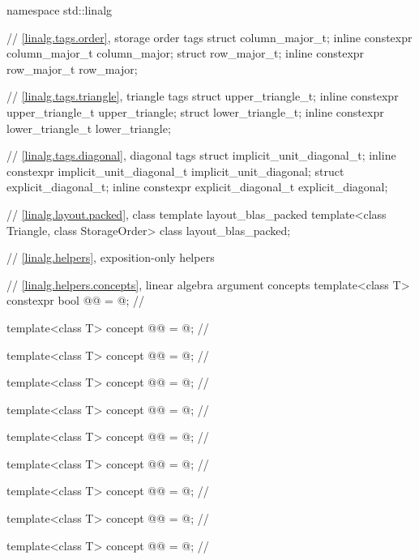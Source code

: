 %
\begin{codeblock}
namespace std::linalg {
  // \ref{linalg.tags.order}, storage order tags
  struct column_major_t;
  inline constexpr column_major_t column_major;
  struct row_major_t;
  inline constexpr row_major_t row_major;

  // \ref{linalg.tags.triangle}, triangle tags
  struct upper_triangle_t;
  inline constexpr upper_triangle_t upper_triangle;
  struct lower_triangle_t;
  inline constexpr lower_triangle_t lower_triangle;

  // \ref{linalg.tags.diagonal}, diagonal tags
  struct implicit_unit_diagonal_t;
  inline constexpr implicit_unit_diagonal_t implicit_unit_diagonal;
  struct explicit_diagonal_t;
  inline constexpr explicit_diagonal_t explicit_diagonal;

  // \ref{linalg.layout.packed}, class template layout_blas_packed
  template<class Triangle, class StorageOrder>
    class layout_blas_packed;

  // \ref{linalg.helpers}, exposition-only helpers

  // \ref{linalg.helpers.concepts}, linear algebra argument concepts
  template<class T>
    constexpr bool @@ = @\seebelow@;               // \expos

  template<class T>
    concept @@ = @\seebelow@;                      // \expos

  template<class T>
    concept @@ = @\seebelow@;                     // \expos

  template<class T>
    concept @@ = @\seebelow@;                   // \expos

  template<class T>
    concept @@ = @\seebelow@;                      // \expos

  template<class T>
    concept @@ = @\seebelow@;                     // \expos

  template<class T>
    concept @@ = @\seebelow@;                   // \expos

  template<class T>
    concept @@ = @\seebelow@;   // \expos

  template<class T>
    concept @@ = @\seebelow@;                      // \expos

  template<class T>
    concept @@ = @\seebelow@;                     // \expos

}
\end{codeblock}
